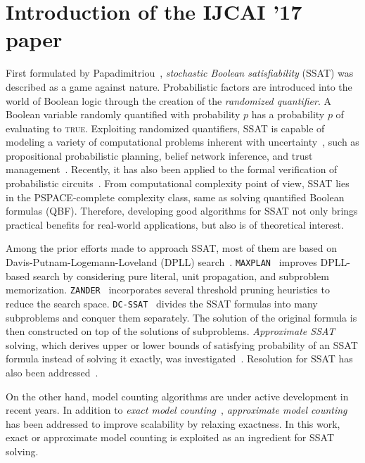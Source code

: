     \section{Introduction of the IJCAI '17 paper}
    First formulated by Papadimitriou~\cite{Papadimitriou1985}, \textit{stochastic Boolean satisfiability} (SSAT) was described as a game against nature.
    Probabilistic factors are introduced into the world of Boolean logic through the creation of the \textit{randomized quantifier}.
    A Boolean variable randomly quantified with probability $p$ has a probability $p$ of evaluating to \textsc{true}.
    Exploiting randomized quantifiers, SSAT is capable of modeling a variety of computational problems inherent with uncertainty~\cite{Hnich2011}, such as propositional probabilistic planning, belief network inference, and trust management~\cite{SATHandbook-SSAT}.
    Recently, it has also been applied to the formal verification of probabilistic circuits~\cite{LeeTC18ProbDesign}.
    From computational complexity point of view, SSAT lies in the PSPACE-complete complexity class, same as solving quantified Boolean formulas (QBF).
    Therefore, developing good algorithms for SSAT not only brings practical benefits for real-world applications, but also is of theoretical interest.

    Among the prior efforts made to approach SSAT, most of them are based on Davis-Putnam-Logemann-Loveland (DPLL) search~\cite{Davis1962}.
    \texttt{MAXPLAN}~\cite{Majercik1998} improves DPLL-based search by considering pure literal, unit propagation, and subproblem memorization.
    \texttt{ZANDER}~\cite{Majercik2003} incorporates several threshold pruning heuristics to reduce the search space.
    \texttt{DC-SSAT}~\cite{Majercik2005} divides the SSAT formulas into many subproblems and conquer them separately.
    The solution of the original formula is then constructed on top of the solutions of subproblems.
    \textit{Approximate SSAT} solving, which derives upper or lower bounds of satisfying probability of an SSAT formula instead of solving it exactly, was investigated~\cite{Majercik2007}.
    Resolution for SSAT has also been addressed~\cite{Teige2010}.

    On the other hand, model counting algorithms are under active development in recent years.
    In addition to \textit{exact model counting}~\cite{Sang2004,Sang2005ModelCounting},
    \textit{approximate model counting}~\cite{Gomes2006,Gomes2007,Chakraborty2016} has been addressed to improve scalability by relaxing exactness.
    In this work, exact or approximate model counting is exploited as an ingredient for SSAT solving.

